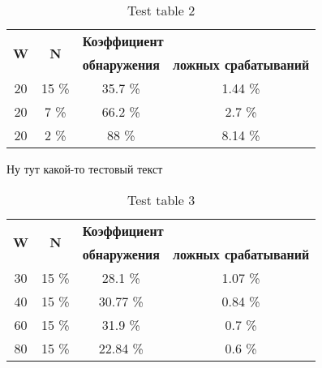 \documentclass[12pt,a4paper]{article}
\begin{document}
\begin{table}
	\caption{Test table 2}
	\label{table:fix_width}
	\begin{center}
		\begin{tabular}{|c|c|c|c|}
		\hline

		\hline
		\multirow{2}{*}{\textbf{W}} & \multirow{2}{*}{\textbf{N}} & \multicolumn{2}{|l|}{\textbf{\hspace{45pt}Коэффициент}} \\
		& & \multicolumn{1}{|c|}{\textbf{обнаружения}} & \multicolumn{1}{|c|}{\textbf{ложных срабатываний}} \\
		\hline 20 & 15 \% & 35.7 \% & 1.44 \% \\
		\hline 20 & 7 \% & 66.2 \% & 2.7 \% \\
		\hline 20 & 2 \% & 88 \% & 8.14 \% \\
		\hline

		\hline
		\end{tabular}
	\end{center}
\end{table}

Ну тут какой-то тестовый текст

\begin{table}
	\caption{Test table 3}
	\label{table:fix_n}
	\begin{center}
		\begin{tabular}{|c|c|c|c|}
		\hline

		\hline
		\multirow{2}{*}{\textbf{W}} & \multirow{2}{*}{\textbf{N}} & \multicolumn{2}{|l|}{\textbf{\hspace{45pt}Коэффициент}} \\
		& & \multicolumn{1}{|c|}{\textbf{обнаружения}} & \multicolumn{1}{|c|}{\textbf{ложных срабатываний}} \\
		\hline 30 & 15 \% & 28.1  \% & 1.07 \% \\
		\hline 40 & 15 \% & 30.77 \% & 0.84 \% \\
		\hline 60 & 15 \% & 31.9  \% & 0.7  \% \\
		\hline 80 & 15 \% & 22.84 \% & 0.6  \% \\
		\hline

		\hline
		\end{tabular}
	\end{center}
\end{table}
\end{document}
